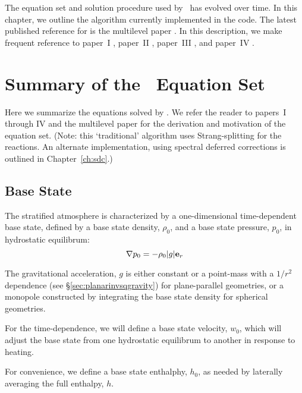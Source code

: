 The equation set and solution procedure used by \maestroex\ has evolved
over time.  In this chapter, we outline the algorithm currently
implemented in the code.  The latest published reference for \maestroex
is the multilevel paper \cite{multilevel}.  In this description, we
make frequent reference to paper~I \cite{lowMach},
paper~II \cite{lowMach2}, paper~III \cite{lowMach3}, and
paper~IV \cite{lowMach4}.





\section{Summary of the \maestroex\ Equation Set}

Here we summarize the equations solved by \maestroex.  We refer the reader
to papers~I through IV and the multilevel paper for the derivation
and motivation of the equation set.  (Note: this `traditional' algorithm
uses Strang-splitting for the reactions.  An alternate implementation, using
spectral deferred corrections is outlined in Chapter~\ref{ch:sdc}.)

\subsection{Base State}

The stratified atmosphere is characterized by a one-dimensional
time-dependent base state, defined by a base state density, $\rho_0$,
and a base state pressure, $p_0$, in hydrostatic equilibrum:
\begin{equation}
\nabla p_0 = -\rho_0 |g| \mathbf{e}_r
\end{equation}

The gravitational acceleration, $g$ is either constant or a point-mass
with a $1/r^2$ dependence (see \S \ref{sec:planarinvsqgravity}) for plane-parallel geometries, or a monopole
constructed by integrating the base state density for spherical
geometries.

For the time-dependence, we will define a base state velocity, $w_0$,
which will adjust the base state from one hydrostatic equilibrum to
another in response to heating.

For convenience, we define a base state enthalphy, $h_0$, as needed
by laterally averaging the full enthalpy, $h$.

